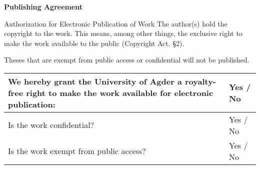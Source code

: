 \large{\textbf{Publishing Agreement}}

{\small {} Authorization for Electronic Publication of Work
The author(s) hold the copyright to the work. This means, among other things, the exclusive right to make the work available to the public (Copyright Act. §2).

Theses that are exempt from public access or confidential will not be published.\\
\begin{center}
\begin{tabular}{ |p{10cm}|p{3cm}|}
\hline
We hereby grant the University of Agder a royalty-free right to make the work available for electronic publication: & Yes / No \\
\hline
Is the work confidential? & Yes / No \\
\hline
Is the work exempt from public access? & Yes / No \\
\hline
\end{tabular}
\end{center}
}
